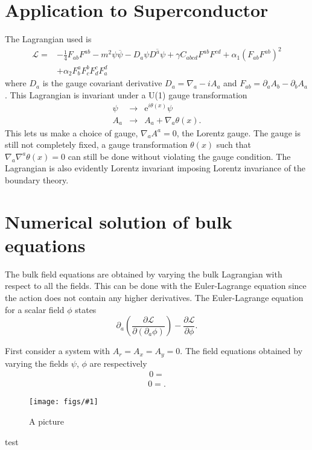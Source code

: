 \documentclass[12pt]{report}
\newcommand{\fig}[3]{
\begin{figure}
\centering
\texttt{[image: figs/\#1]}
\caption{#2}
\end{figure}
}
\begin{document}
\section{Application to Superconductor}
The Lagrangian used is
\begin{eqnarray}
 \mathcal{L}=&-\frac{1}{4}F_{ab}F^{ab}-m^2\psi\overline{\psi}-D_a\psi\overline{D^a\psi}
+\gamma C_{abcd}F^{ab}F^{cd}+\alpha_1(F_{ab}F^{ab})^2\nonumber\\
&+\alpha_2F^a_bF^b_cF^c_dF^d_a
\end{eqnarray}
where $D_a$ is the gauge covariant derivative $D_a=\nabla_a-iA_a$ and $F_{ab}=\partial_aA_b-\partial_bA_a$. This Lagrangian is invariant under a U(1) gauge transformation
\begin{eqnarray}
 \psi&\rightarrow&\mathrm{e}^{i\theta(x)}\psi\\
 A_a&\rightarrow& A_a+\nabla_a\theta(x).
\end{eqnarray}
This lets us make a choice of gauge, $\nabla_aA^a=0$, the Lorentz gauge. The gauge is still not completely fixed, a gauge transformation $\theta(x)$ such that $\nabla_a\nabla^a\theta(x)=0$ can still be done without violating the gauge condition.
The Lagrangian is also evidently Lorentz invariant imposing Lorentz invariance of the boundary theory.
\section{Numerical solution of bulk equations}
The bulk field equations are obtained by varying the bulk Lagrangian with respect to all the fields. This can be done with the Euler-Lagrange equation since the action does not contain any higher derivatives. The Euler-Lagrange equation for a scalar field $\phi$ states
\begin{equation}
 \partial_a\left(\frac{\partial\mathcal{L}}{\partial(\partial_a\phi)}\right)-\frac{\partial\mathcal{L}}{\partial\phi}.
\end{equation}


First consider a system with $A_r=A_x=A_y=0$. The field equations obtained by varying the fields $\psi$, $\phi$ are respectively
\begin{eqnarray}
0=
\end{eqnarray}
\begin{eqnarray}
0=.
\end{eqnarray}
\fig{O2_T}{A picture}
\section{test}
\end{document}
